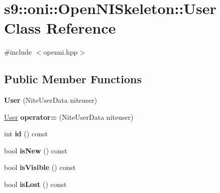 \hypertarget{classs9_1_1oni_1_1OpenNISkeleton_1_1User}{\section{s9\-:\-:oni\-:\-:Open\-N\-I\-Skeleton\-:\-:User Class Reference}
\label{classs9_1_1oni_1_1OpenNISkeleton_1_1User}
}


{\ttfamily \#include $<$openni.\-hpp$>$}

\subsection*{Public Member Functions}
\begin{DoxyCompactItemize}
\item 
\hypertarget{classs9_1_1oni_1_1OpenNISkeleton_1_1User_aad0633c347554cc94641eef4f7b84391}{{\bfseries User} (Nite\-User\-Data niteuser)}\label{classs9_1_1oni_1_1OpenNISkeleton_1_1User_aad0633c347554cc94641eef4f7b84391}

\item 
\hypertarget{classs9_1_1oni_1_1OpenNISkeleton_1_1User_af1094f445bc811b059a156ccb8304253}{\hyperlink{classs9_1_1oni_1_1OpenNISkeleton_1_1User}{User} {\bfseries operator=} (Nite\-User\-Data niteuser)}\label{classs9_1_1oni_1_1OpenNISkeleton_1_1User_af1094f445bc811b059a156ccb8304253}

\item 
\hypertarget{classs9_1_1oni_1_1OpenNISkeleton_1_1User_aef12ca2caaaff29d147db36c72be307b}{int {\bfseries id} () const }\label{classs9_1_1oni_1_1OpenNISkeleton_1_1User_aef12ca2caaaff29d147db36c72be307b}

\item 
\hypertarget{classs9_1_1oni_1_1OpenNISkeleton_1_1User_a61e56cd778ab0fe4c5fdd6ebd2aa9189}{bool {\bfseries is\-New} () const }\label{classs9_1_1oni_1_1OpenNISkeleton_1_1User_a61e56cd778ab0fe4c5fdd6ebd2aa9189}

\item 
\hypertarget{classs9_1_1oni_1_1OpenNISkeleton_1_1User_acf864a2a10f30adb2d03a3ab845701e8}{bool {\bfseries is\-Visible} () const }\label{classs9_1_1oni_1_1OpenNISkeleton_1_1User_acf864a2a10f30adb2d03a3ab845701e8}

\item 
\hypertarget{classs9_1_1oni_1_1OpenNISkeleton_1_1User_aa0fcbee76392ccdb926031ee251b2151}{bool {\bfseries is\-Lost} () const }\label{classs9_1_1oni_1_1OpenNISkeleton_1_1User_aa0fcbee76392ccdb926031ee251b2151}


\end{DoxyCompactItemize}
